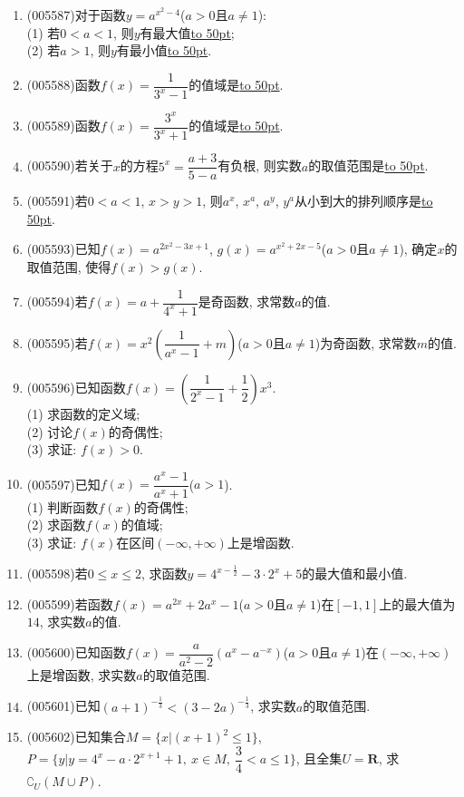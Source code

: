 \documentclass[10pt,a4paper]{article}
\newcommand{\blank}[1]{\underline{\hbox to #1pt{}}}
\begin{document}
\begin{enumerate}[1.]
\item {\tiny (005587)}对于函数$y=a^{x^2-4}$($a>0$且$a\ne 1$):\\
(1) 若$0<a<1$, 则$y$有最大值\blank{50};\\
(2) 若$a>1$, 则$y$有最小值\blank{50}.
\item {\tiny (005588)}函数$f(x)=\dfrac 1{3^x-1}$的值域是\blank{50}.
\item {\tiny (005589)}函数$f(x)=\dfrac{3^x}{3^x+1}$的值域是\blank{50}.
\item {\tiny (005590)}若关于$x$的方程$5^x=\dfrac{a+3}{5-a}$有负根, 则实数$a$的取值范围是\blank{50}.
\item {\tiny (005591)}若$0<a<1$, $x>y>1$, 则$a^x$, $x^a$, $a^y$, $y^a$从小到大的排列顺序是\blank{50}.
\item {\tiny (005593)}已知$f(x)=a^{2x^2-3x+1}$, $g(x)=a^{x^2+2x-5}$($a>0$且$a\ne 1$), 确定$x$的取值范围, 使得$f(x)>g(x)$.
\item {\tiny (005594)}若$f(x)=a+\dfrac 1{4^x+1}$是奇函数, 求常数$a$的值.
\item {\tiny (005595)}若$f(x)=x^2(\dfrac 1{a^x-1}+m)$($a>0$且$a\ne 1$)为奇函数, 求常数$m$的值.
\item {\tiny (005596)}已知函数$f(x)=(\dfrac 1{2^x-1}+\dfrac 12)x^3$.\\
(1) 求函数的定义域;\\
(2) 讨论$f(x)$的奇偶性;\\
(3) 求证: $f(x)>0$.
\item {\tiny (005597)}已知$f(x)=\dfrac{a^x-1}{a^x+1}$($a>1$).\\
(1) 判断函数$f(x)$的奇偶性;\\
(2) 求函数$f(x)$的值域;\\
(3) 求证: $f(x)$在区间$(-\infty ,+\infty)$上是增函数.
\item {\tiny (005598)}若$0\le x\le 2$, 求函数$y=4^{x-\frac 12}-3\cdot 2^x+5$的最大值和最小值.
\item {\tiny (005599)}若函数$f(x)=a^{2x}+2a^x-1$($a>0$且$a\ne 1$)在$[-1, 1]$上的最大值为$14$, 求实数$a$的值.
\item {\tiny (005600)}已知函数$f(x)=\dfrac a{a^2-2}(a^x-a^{-x})$($a>0$且$a\ne 1$)在$(-\infty ,+\infty)$上是增函数, 求实数$a$的取值范围.
\item {\tiny (005601)}已知$(a+1)^{-\frac 13}<(3-2a)^{-\frac 13}$, 求实数$a$的取值范围.
\item {\tiny (005602)}已知集合$M=\{x|(x+1)^2\le 1\}$, $P=\{y|y=4^x-a\cdot 2^{x+1}+1,\ x\in M,\ \dfrac 34<a\le 1\}$, 且全集$U=\mathbf{R}$, 求$\complement _U(M\cup P)$.

\end{enumerate}
\end{document}
